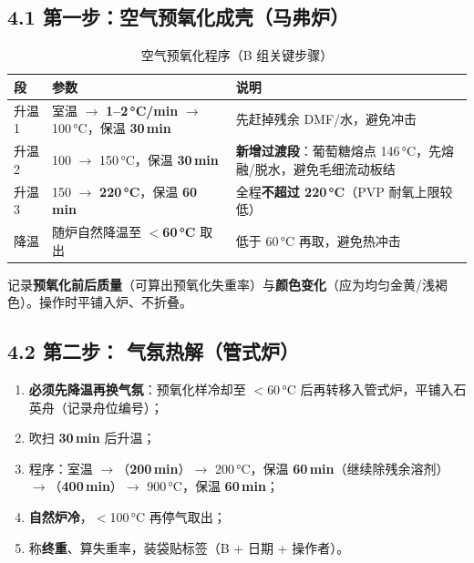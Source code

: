 \documentclass[a4paper, 11pt]{ctexart}
\begin{document}
\subsection*{4.1 第一步：空气预氧化成壳（马弗炉）}
\begin{table}[htbp]
\centering
\caption{空气预氧化程序（B 组关键步骤）}
\begin{tabularx}{\textwidth}{l l X}
\toprule
段 & 参数 & 说明 \\
\midrule
升温 1 & 室温 $\rightarrow$ \textbf{1--2\,°C/min} $\rightarrow$ 100\,°C，保温 \textbf{30\,min} & 先赶掉残余 DMF/水，避免冲击 \\
升温 2 & 100 $\rightarrow$ 150\,°C，保温 \textbf{30\,min} & \textbf{新增过渡段}：葡萄糖熔点 146\,°C，先熔融/脱水，避免毛细流动板结 \\
升温 3 & 150 $\rightarrow$ \textbf{220\,°C}，保温 \textbf{60\,min} & 全程\textbf{不超过 220\,°C}（PVP 耐氧上限较低） \\
降温 & 随炉自然降温至 \textbf{$<$60\,°C} 取出 & 低于 60\,°C 再取，避免热冲击 \\
\bottomrule
\end{tabularx}
\end{table}
\noindent 记录\textbf{预氧化前后质量}（可算出预氧化失重率）与\textbf{颜色变化}（应为均匀金黄/浅褐色）。操作时平铺入炉、不折叠。

\subsection*{4.2 第二步： 气氛热解（管式炉）}
\begin{enumerate}
  \item \textbf{必须先降温再换气氛}：预氧化样冷却至 $<$60\,°C 后再转移入管式炉，平铺入石英舟（记录舟位编号）；
  \item {} 吹扫 \textbf{30\,min} 后升温；
  \item 程序：室温 $\rightarrow$（\textbf{200\,min}）$\rightarrow$ 200\,°C，保温 \textbf{60\,min}（继续除残余溶剂）$\rightarrow$（\textbf{400\,min}）$\rightarrow$ 900\,°C，保温 \textbf{60\,min}；
  \item \textbf{自然炉冷}，$<$100\,°C 再停气取出；
  \item 称\textbf{终重}、算失重率，装袋贴标签（B + 日期 + 操作者）。
\end{enumerate}
\end{document}
